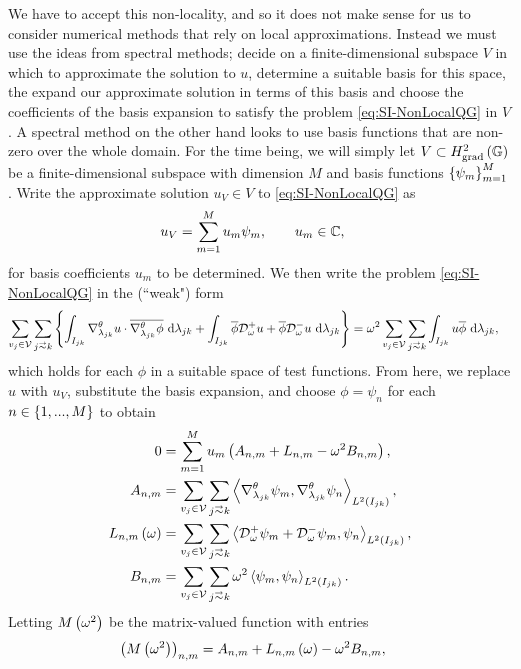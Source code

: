 We have to accept this non-locality, and so it does not make sense for us to consider numerical methods that rely on local approximations.
Instead we must use the ideas from spectral methods; decide on a finite-dimensional subspace $V$ in which to approximate the solution to $u$, determine a suitable basis for this space, the expand our approximate solution in terms of this basis and choose the coefficients of the basis expansion to satisfy the problem \eqref{eq:SI-NonLocalQG} in $V$.
A spectral method on the other hand looks to use basis functions that are non-zero over the whole domain.
For the time being, we will simply let $V\subset H^2_\mathrm{grad}\left( \mathbb{G} \right)$ be a finite-dimensional subspace with dimension $M$ and basis functions $\left\{ \psi_m \right\}_{m=1}^{M}$.
Write the approximate solution $u_V\in V$ to \eqref{eq:SI-NonLocalQG} as
\begin{align*}
	u_V &= \sum_{m=1}^M u_m\psi_m, \qquad u_m\in\mathbb{C},
\end{align*}
for basis coefficients $u_m$ to be determined.
We then write the problem \eqref{eq:SI-NonLocalQG} in the (``weak") form
\begin{align*}
	\sum_{v_j\in\vertSet}\sum_{j\conLeft k} 
	\clbracs{ 
	\integral{I_{jk}}{\tgrad_{\lambda_{jk}}u\cdot\overline{\tgrad_{\lambda_{jk}}\phi}}{\lambda_{jk}} 
	+ \integral{I_{jk}}{\overline{\phi}\dtn^+_{\omega}u + \overline{\phi}\dtn^-_{\omega}u}{\lambda_{jk}} 
	}
	&= \omega^2 \sum_{v_j\in\vertSet}\sum_{j\conLeft k}\integral{I_{jk}}{u\overline{\phi}}{\lambda_{jk}},
\end{align*}
which holds for each $\phi$ in a suitable space of test functions.
From here, we replace $u$ with $u_V$, substitute the basis expansion, and choose $\phi=\psi_n$ for each $n\in\left\{ 1,...,M \right\}$ to obtain
\begin{align*}
	0 &= 
	\sum_{m=1}^{M} u_m \bracs{ A_{n,m} + L_{n,m} - \omega^2 B_{n,m} }, \\
	A_{n,m} &= \sum_{v_j\in\vertSet}\sum_{j\conLeft k} \ip{\tgrad_{\lambda_{jk}}\psi_m}{\tgrad_{\lambda_{jk}}\psi_n}_{L^2\bracs{I_{jk}}}, \\
	L_{n,m}\bracs{\omega} &= \sum_{v_j\in\vertSet}\sum_{j\conLeft k} \ip{\dtn^+_{\omega}\psi_m + \dtn^-_{\omega}\psi_m}{\psi_n}_{L^2\bracs{I_{jk}}}, \\
	B_{n,m} &= \sum_{v_j\in\vertSet}\sum_{j\conLeft k} \omega^2\ip{\psi_m}{\psi_n}_{L^2\bracs{I_{jk}}}.
\end{align*}
Letting $M\left( \omega^2 \right)$ be the matrix-valued function with entries
\begin{align} \label{eq:SI-NonLocalQGNumericalDisc}
	\left( M\left( \omega^2 \right) \right)_{n,m} &= A_{n,m} + L_{n,m}\left( \omega \right) - \omega^2 B_{n,m},
\end{align}
